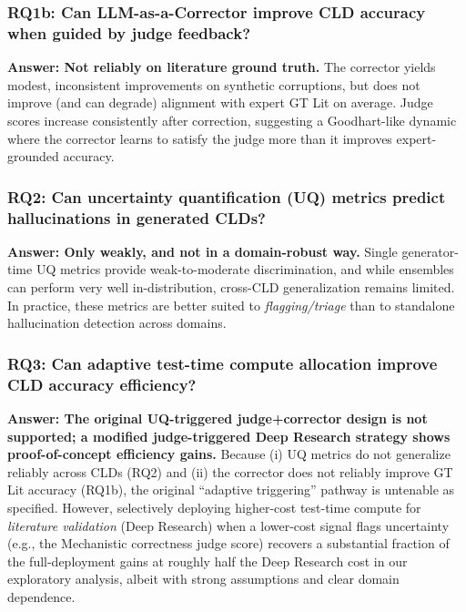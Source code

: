 \subsubsection*{RQ1b: Can LLM-as-a-Corrector improve CLD accuracy when guided by judge feedback?}
\textbf{Answer: Not reliably on literature ground truth.} The corrector yields modest, inconsistent improvements on synthetic corruptions, but does not improve (and can degrade) alignment with expert GT Lit on average. Judge scores increase consistently after correction, suggesting a Goodhart-like dynamic where the corrector learns to satisfy the judge more than it improves expert-grounded accuracy.

\subsubsection*{RQ2: Can uncertainty quantification (UQ) metrics predict hallucinations in generated CLDs?}
\textbf{Answer: Only weakly, and not in a domain-robust way.} Single generator-time UQ metrics provide weak-to-moderate discrimination, and while ensembles can perform very well in-distribution, cross-CLD generalization remains limited. In practice, these metrics are better suited to \textit{flagging/triage} than to standalone hallucination detection across domains.

\subsubsection*{RQ3: Can adaptive test-time compute allocation improve CLD accuracy efficiency?}
\textbf{Answer: The original UQ-triggered judge+corrector design is not supported; a modified judge-triggered Deep Research strategy shows proof-of-concept efficiency gains.} Because (i) UQ metrics do not generalize reliably across CLDs (RQ2) and (ii) the corrector does not reliably improve GT Lit accuracy (RQ1b), the original ``adaptive triggering'' pathway is untenable as specified. However, selectively deploying higher-cost test-time compute for \textit{literature validation} (Deep Research) when a lower-cost signal flags uncertainty (e.g., the Mechanistic correctness judge score) recovers a substantial fraction of the full-deployment gains at roughly half the Deep Research cost in our exploratory analysis, albeit with strong assumptions and clear domain dependence.

